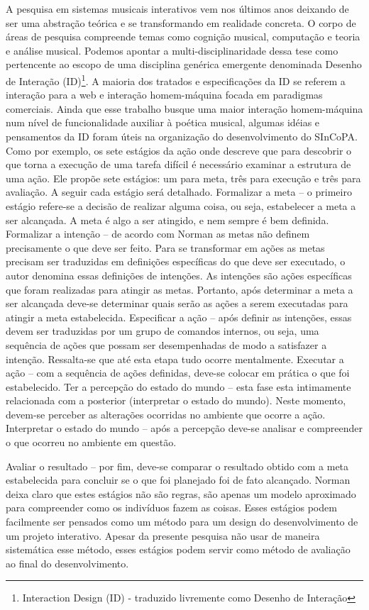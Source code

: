 \documentclass{ppgmus}
\begin{document}
A pesquisa em sistemas musicais interativos vem nos últimos anos
deixando de ser uma abstração teórica e se transformando em realidade
concreta. O corpo de áreas de pesquisa compreende temas como cognição
musical, computação e teoria e análise musical.
Podemos apontar a multi-disciplinaridade dessa tese como pertencente 
ao escopo de uma disciplina genérica emergente denominada Desenho de Interação (ID)\footnote{Interaction
 Design (ID) - traduzido livremente como Desenho de Interação}.
A maioria dos tratados e especificações da ID se referem a interação para a web
e interação homem-máquina focada em paradigmas comerciais. Ainda que esse trabalho busque
uma maior interação homem-máquina num nível de funcionalidade auxiliar à poética musical, algumas idéias e 
pensamentos da ID foram úteis na organização do desenvolvimento do SInCoPA. 
Como por exemplo, os sete estágios da ação \cite{norman06:design} onde descreve que para 
descobrir o que torna a
execução de uma tarefa difícil é necessário examinar a
estrutura de uma ação. Ele propõe sete estágios: um para
meta, três para execução e três para avaliação. A seguir cada
estágio será detalhado.
Formalizar a meta – o primeiro estágio refere-se a decisão de
realizar alguma coisa, ou seja, estabelecer a meta a ser
alcançada. A meta é algo a ser atingido, e nem sempre é bem
definida.
Formalizar a intenção – de acordo com Norman as
metas não definem precisamente o que deve ser feito. Para
se transformar em ações as metas precisam ser traduzidas
em definições específicas do que deve ser executado, o autor
denomina essas definições de intenções. As intenções são
ações específicas que foram realizadas para atingir as metas.
Portanto, após determinar a meta a ser alcançada deve-se
determinar quais serão as ações a serem executadas para
atingir a meta estabelecida.
Especificar a ação – após definir as intenções, essas devem
ser traduzidas por um grupo de comandos internos, ou seja,
uma sequência de ações que possam ser desempenhadas de
modo a satisfazer a intenção. Ressalta-se que até esta etapa
tudo ocorre mentalmente.
Executar a ação – com a sequência de ações definidas,
deve-se colocar em prática o que foi estabelecido.
Ter a percepção do estado do mundo – esta fase esta
intimamente relacionada com a posterior (interpretar o estado
do mundo). Neste momento, devem-se perceber as alterações
ocorridas no ambiente que ocorre a ação.
Interpretar o estado do mundo – após a percepção deve-se
analisar e compreender o que ocorreu no ambiente em
questão.

Avaliar o resultado – por fim, deve-se comparar o resultado
obtido com a meta estabelecida para concluir se o que foi
planejado foi de fato alcançado.
Norman deixa claro que estes estágios não são regras,
são apenas um modelo aproximado para compreender como
os indivíduos fazem as coisas. Esses estágios podem facilmente
ser pensados como um método para um design do desenvolvimento 
de um projeto interativo. Apesar da presente pesquisa não usar de 
maneira sistemática esse método, esses estágios podem servir como
método de avaliação ao final do desenvolvimento.
\end{document}
